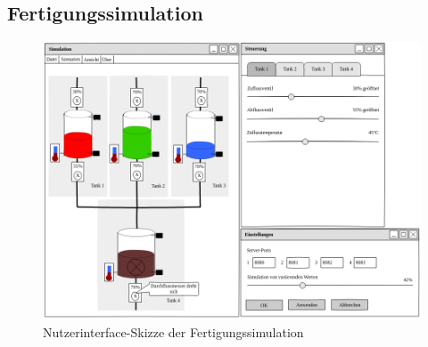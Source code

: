 \documentclass[parskip=full]{scrartcl}
\begin{document}
\subsection{Fertigungssimulation}
\begin{figure}[h]
  \centering
  \includegraphics[scale=0.5]{media/ui-sketch-server.png}
  \caption{Nutzerinterface-Skizze der Fertigungssimulation}
\end{figure}
\pagebreak
\end{document}
